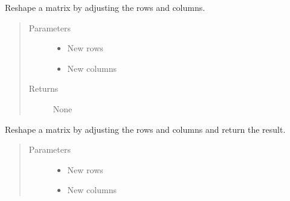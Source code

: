 \documentclass[letterpaper,10pt,english]{sphinxmanual}
\begin{document}
\begin{fulllineitems}
\begin{fulllineitems}
\end{fulllineitems}


\begin{fulllineitems}
\label{\detokenize{libpymath.matrix:libpymath.matrix.matrix.Matrix.reshape}}
Reshape a matrix by adjusting the rows and columns.
\begin{quote}\begin{description}
\item[{Parameters}] \leavevmode\begin{itemize}
\item {} 
 \textendash{} New rows

\item {} 
 \textendash{} New columns

\end{itemize}

\item[{Returns}] \leavevmode
None

\end{description}\end{quote}

\end{fulllineitems}


\begin{fulllineitems}
\label{\detokenize{libpymath.matrix:libpymath.matrix.matrix.Matrix.reshaped}}
Reshape a matrix by adjusting the rows and columns and return the result.
\begin{quote}\begin{description}
\item[{Parameters}] \leavevmode\begin{itemize}
\item {} 
 \textendash{} New rows

\item {} 
 \textendash{} New columns


\end{itemize}
\end{description}
\end{quote}
\end{fulllineitems}
\end{fulllineitems}
\end{document}
